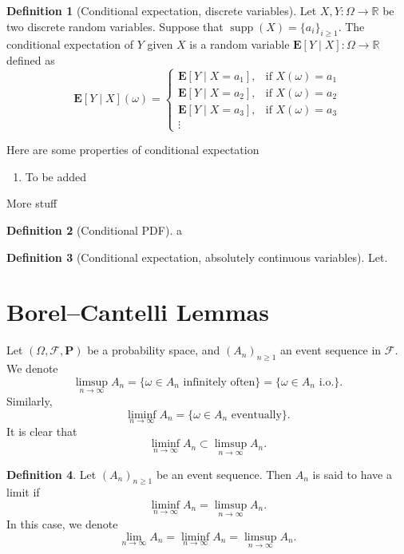 \documentclass[11pt,a4paper]{article}
\theoremstyle{definition}
\newtheorem{definition}{Definition}[section]
\theoremstyle{plain}
\DeclareMathOperator{\supp}{supp}
\newcommand{\R}{\mathbb{R}}
\newcommand{\E}{\mathbf{E}}
\newcommand{\Prob}{\mathbf{P}}
\begin{document}
  \begin{definition}[Conditional expectation, discrete variables]
    Let $X,Y \colon \Omega \to \R$ be two discrete random variables.
    Suppose that $\supp(X) = \{a_i\}_{i \geq 1}$.
    The conditional expectation of $Y$ given $X$ is a random variable
    $\E[Y \mid X] \colon \Omega \to \R$ defined as
    \[
      \E[Y \mid X](\omega) =
      \begin{cases}
        \E[Y \mid X = a_1], &\text{if } X(\omega) = a_1 \\
        \E[Y \mid X = a_2], &\text{if } X(\omega) = a_2 \\
        \E[Y \mid X = a_3], &\text{if } X(\omega) = a_3 \\
        \vdots
      \end{cases}
    \]
  \end{definition}

  Here are some properties of conditional expectation
  \begin{enumerate}
    \item To be added
  \end{enumerate}

  More stuff

  \begin{definition}[Conditional PDF]
    a
  \end{definition}
  \begin{definition}[Conditional expectation, absolutely continuous variables]
    Let. 
  \end{definition}

  \newpage

  \section{Borel--Cantelli Lemmas}

  Let $(\Omega, \mathcal F, \Prob)$ be a probability space, and 
  $(A_n)_{n \geq 1}$ an event sequence in $\mathcal F$.
  We denote
  \[
    \limsup_{n \to \infty} A_n =
    \{\omega \in A_n\text{ infinitely often}\} =
    \{\omega \in A_n\text{ i.o.}\}.
  \]
  Similarly,
  \[
    \liminf_{n \to \infty} A_n =
    \{\omega \in A_n \text{ eventually}\}.
  \]
  It is clear that
  \[
    \liminf_{n \to \infty} A_n \subset \limsup_{n \to \infty} A_n.
  \]
  \begin{definition}
    Let $(A_n)_{n \geq 1}$ be an event sequence.
    Then $A_n$ is said to have a limit if
    \[
      \liminf_{n \to \infty} A_n = \limsup_{n \to \infty} A_n.
    \]
    In this case, we denote
    \[
      \lim_{n \to \infty} A_n =
      \liminf_{n \to \infty} A_n = \limsup_{n \to \infty} A_n.
    \]
  \end{definition}
\end{document}
